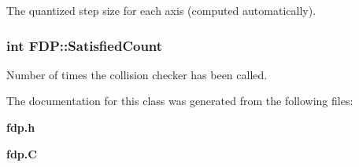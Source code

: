 The quantized step size for each axis (computed automatically).

\subsubsection{\setlength{\rightskip}{0pt plus 5cm}int FDP::Satisfied\-Count}\label{classFDP_m0}


Number of times the collision checker has been called.



The documentation for this class was generated from the following files:\begin{CompactItemize}
\item 
{\bf fdp.h}\item 
{\bf fdp.C}\end{CompactItemize}

